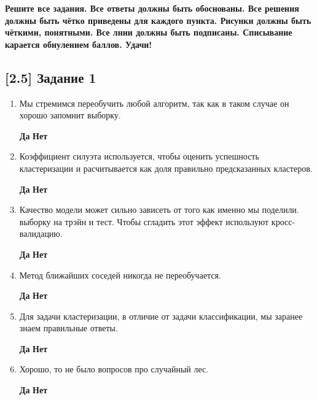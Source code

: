 \documentclass[12pt, a4paper, oneside]{article}
\begin{document}
\textbf{Решите все задания. Все ответы должны быть обоснованы. Все решения должны быть чётко приведены для каждого пункта. Рисунки должны быть чёткими, понятными. Все лнии должны быть подписаны. Списывание карается обнулением баллов. Удачи!}

\subsection*{[2.5] Задание 1 }
\begin{enumerate}
	
	\item  Мы стремимся переобучить любой алгоритм, так как в таком случае он хорошо запомнит выборку.
	
	\hspace{2cm} \textbf{Да}  \hspace{4cm} \textbf{Нет} 
	
	\item  Коэффициент силуэта используется, чтобы оценить успешность кластеризации и  расчитывается как доля правильно предсказанных кластеров.
	
	\hspace{2cm} \textbf{Да}  \hspace{4cm} \textbf{Нет} 
	
	\item  Качество модели может сильно зависеть от того как именно мы поделили. выборку на трэйн и тест. Чтобы сгладить этот эффект используют кросс-валидацию.
	
	\hspace{2cm} \textbf{Да}  \hspace{4cm} \textbf{Нет} 
	
	\item  Метод ближайших соседей никогда не переобучается. 
	
	\hspace{2cm} \textbf{Да}  \hspace{4cm} \textbf{Нет} 
	
	\item  Для задачи кластеризации, в отличие от задачи классификации, мы заранее знаем правильные ответы. 
	
	\hspace{2cm} \textbf{Да}  \hspace{4cm} \textbf{Нет} 
	
	\item  	Хорошо, то не было вопросов про случайный лес.
	
	\hspace{2cm} \textbf{Да}  \hspace{4cm} \textbf{Нет} 

\end{enumerate}
\end{document}

